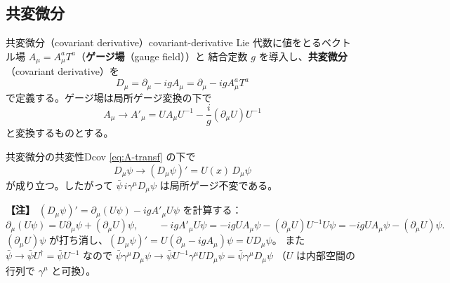 \documentclass[uplatex,dvipdfmx,a4paper,11pt,openany]{jsbook}
\newcommand{\term}[2]{\textbf{#1}（#2）}
\newenvironment{note}{\vspace{1ex}\par\footnotesize\noindent\textbf{【注】}}{\par\vspace{1ex}}
\numberwithin{equation}{chapter}
\theoremstyle{definition}
\theoremstyle{plain}
\theoremstyle{remark}
\begin{document}
\subsection{共変微分}
\begin{mydef}{共変微分（covariant derivative）}{covariant-derivative}
Lie 代数に値をとるベクトル場 $A_\mu=A_\mu^aT^a$（\term{ゲージ場}{gauge field}）と
結合定数 $g$ を導入し、\term{共変微分}{covariant derivative}を
\begin{equation}
D_\mu=\partial_\mu-igA_\mu=\partial_\mu-igA_\mu^aT^a
\end{equation}
で定義する。ゲージ場は局所ゲージ変換の下で
\begin{equation}
A_\mu\longrightarrow A'_\mu
=UA_\mu U^{-1}-\frac ig(\partial_\mu U)U^{-1}
\label{eq:A-transf}
\end{equation}
と変換するものとする。
\end{mydef}
\begin{myprop}{共変微分の共変性}{Dcov}
\eqref{eq:A-transf} の下で
\begin{equation}
D_\mu\psi\longrightarrow (D_\mu\psi)'=U(x)\,D_\mu\psi
\end{equation}
が成り立つ。したがって $\bar\psi\,i\gamma^\mu D_\mu\psi$ は局所ゲージ不変である。
\end{myprop}
\begin{note}
$(D_\mu\psi)'=\partial_\mu(U\psi)-igA'_\mu U\psi$ を計算する：
\[
\partial_\mu(U\psi)=U\partial_\mu\psi+(\partial_\mu U)\psi,
\qquad
-igA'_\mu U\psi
=-igUA_\mu\psi-(\partial_\mu U)U^{-1}U\psi
=-igUA_\mu\psi-(\partial_\mu U)\psi .
\]
$(\partial_\mu U)\psi$ が打ち消し、$(D_\mu\psi)'=U(\partial_\mu-igA_\mu)\psi=UD_\mu\psi$。
また $\bar\psi\to\bar\psi U^\dagger=\bar\psi U^{-1}$ なので
$\bar\psi\gamma^\mu D_\mu\psi\to\bar\psi U^{-1}\gamma^\mu UD_\mu\psi=\bar\psi\gamma^\mu D_\mu\psi$
（$U$ は内部空間の行列で $\gamma^\mu$ と可換）。
\end{note}
\end{document}
